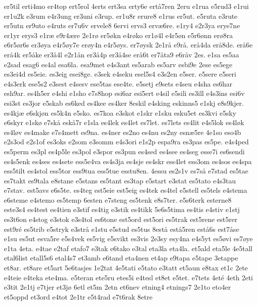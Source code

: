 er5til
erti4mo
er4top
ert5rol
4erts
ert3sa
erty6e
ert^^e57ren
2eru
e1rua
e5rud3
e1rui
er1u2k
e3rum
e4r3ung
er3uni
e3rup.
er1u8r
erure8
e1rus
er5ut.
e5ruta
e3rute
er5utn
er9uto
e4ruts
er7u6v
ervele8
6ervi
ervs3
erv^^e66re.
e1ry4
e2r3ya
erye7ne
er1yr
erys3
e1r^^e6
e9r4^^e6re
2e1r^^f8
er5^^f8kn
e4r^^f8ko
er1^^f84l
e4r5^^f8n
e5r6^^f8nn
er^^f88ra
e6r5^^f8r6s
er3^^f8ya
e4r5^^f8y7e
er^^f8y4n
e4r5^^f8ys.
er7^^f8ysk
2e1r^^e5
e9r^^e5.
er^^e54da
er^^e58de.
er^^e56e
er^^e54k
er5^^e5ke
er3^^e54l
e2r1^^e5n
er3^^e54p
er3^^e54se
er^^e56t
er7^^e5ta9
e6r^^e5v
2es.
e1sa
es5aa
e2sad
esag6
es4al
esa6la.
esa9met
e4s3ant
es5arab
es5arv
esbi9e
2ese
es5ege
es3ei4d
es5eie.
es3eig
esei8ge.
e3sek
e4seku
esel5s4
e3s2en
e5ser.
e5sere
e5seri
e4s3erk
ese5s2
e3sest
e4sesv
ese5tas
ese4te.
e5setj
e9sets
e4seu
e4sha
es6har
esh9ar.
es4h5er
e4shi
e1sho
e7s8hop
esi6ar
esi5ert
e4sil
e5sili
es3ill
e4s3ins
esi6v
esi3st
es3jor
e5skab
es6ked
es4kee
es4ker
8eskil
e4sking
eskinns5
e1skj
e8s9kjer.
es4kj^^e6
e6skj^^f8n
es5k4n
e5sko.
es7koa
e3skot
e1skr
e1sku
esku5et
es3kvi
e5sky
e6skyr
e1sk^^f8
e7sk^^e5
esk^^e57r
e1sla
es4lek
es4let
es7let.
es7lets
es4lit
e4s5lok
es4l^^f8k
es4l^^f8v
es4make
e7s4mett
es9na.
es4ner
es2no
es4nu
es2ny
esn^^e65re
4e1so
eso4b
e2s3od
e2s1of
es3oks
e2som
e3somm
e4s3ori
e1s2p
espa9ra
es3pas
es5pe.
e4s4ped
es5perm
es3pl
es4p5le
es3pol
e3spor
es3pun
es4sed
es4see
es4seg
esse7i
es6sendi
es4s5enk
es4ses
es4sete
ess5e4va
es4s3ja
es4sje
es4skr
ess4let
ess3om
es4sos
es4spa
ess5tilt
es4stol
ess5tor
ess9tua
ess5tue
esstu8en.
4essu
es2s1v
es7s^^e5
e7stad
es5tae
es7takt
es9tala
e8stane
e5stans
es5tant
es3tap
e5start
e3stat
es5tato
e4s3tau
e7stav.
est5avs
e6s5te.
es4teg
est5eie
est5eig
es4tek
es4tel
e5stell
es5tels
e4stema
e6steme
e4stemo
es5temp
6esten
e7steng
es5tenk
e8s7ter.
e5s6terk
esterne8
este3s4
es4test
es4tien
e3stif
es4tig
e3stik
es4tikk
5e6s5tima
es4tis
e4stiv
e1stj
es3t6on
e4stog
e3stok
e3s4tol
es6tone
est5ord
est5ori
es5trak
est5rene
est5rer
est9r^^e9
es5trib
e5stryk
e3str^^e5
e1stu
e5stud
es5tus
8est^^e5
est^^e55ren
est^^e56s
est7^^e5se
e1su
es5ut
esva5re
e5s4vek
es5vig
e5svikt
es3vis
2e3sy
esy4na
e4s5yt
es5^^f8vi
es7^^f8ye
e1ta
4eta.
e4tae
e2taf
etafo7
e3tak
e6tako
e3tal
eta3la
eta4la.
et5ald
eta5le
4e5tall
etal6list
etall5s6
etal4s7
et3amb
e6tand
eta4nen
et4ap
e9tapa
e5tape
3etappe
et8ar.
et8are
et5art
5e6tasjes
1e2tat
4e5tati
e5tato
e3tatt
et5aun
e8tax
et1c
2ete
e4teie
e4teka
ete4ma.
e5teran
ete5ru
etes5i
e4tesl
et8et
e5tet.
e7tets
4et^^e9
4eth
2eti
e3tit
2e1tj
e7tjer
et3j^^f8
6etl
et5m
2etn
et6nev
etning4
etnings7
2e1to
eto4er
et5oppd
et3ord
e4tot
2e1tr
e5t4rad
e7t6rak
8etre
